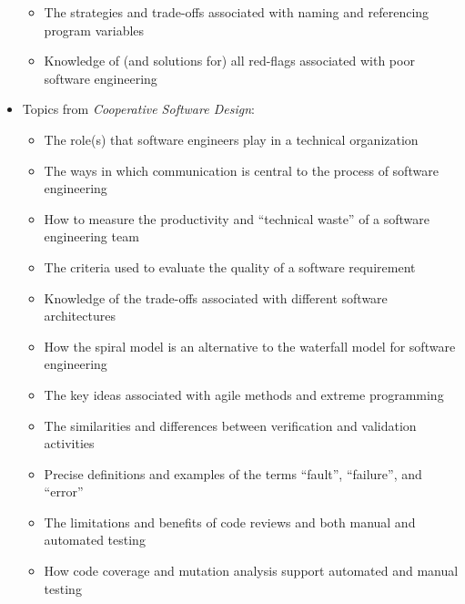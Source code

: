 \documentclass[11pt]{article}
\newcommand{\cooperative}{{\em Cooperative Software Design\/}}
\begin{document}
\begin{itemize}
\begin{itemize}
      \item The strategies and trade-offs associated with naming and referencing program variables

      \item Knowledge of (and solutions for) all red-flags associated with poor software engineering

    \end{itemize}

  \item Topics from \cooperative{}:
    \vspace*{-.05in}
    \begin{itemize}

      \itemsep 0.05in

      \item The role(s) that software engineers play in a technical organization

      \item The ways in which communication is central to the process of
        software engineering

      \item How to measure the productivity and ``technical waste'' of a
        software engineering team

      \item The criteria used to evaluate the quality of a software requirement

      \item Knowledge of the trade-offs associated with different software
        architectures

      \item How the spiral model is an alternative to the waterfall model for
        software engineering

      \item The key ideas associated with agile methods and extreme programming

      \item The similarities and differences between verification and validation
        activities

      \item Precise definitions and examples of the terms ``fault'',
        ``failure'', and ``error''

      \item The limitations and benefits of code reviews and both manual and
        automated testing

      \item How code coverage and mutation analysis support automated and manual
        testing


\end{itemize}
\end{itemize}
\end{document}
